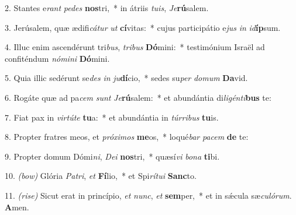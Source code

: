 2. Stantes e\textit{rant} \textit{pe}\textit{des} \textbf{nos}tri,~* 
	in átriis \textit{tu}\textit{is}, \textit{Je}\textbf{rú}salem.

3. Jerúsalem, quæ ædifi\textit{cá}\textit{tur} \textit{ut} \textbf{cí}vitas:~*
	cujus participátio e\textit{jus} \textit{in} \textit{id}\textbf{íp}sum.

4. Illuc enim ascendérunt tri\textit{bus}, \textit{tri}\textit{bus} \textbf{Dó}mini:~*
	testimónium Israël ad confiténdum \textit{nó}\textit{mi}\textit{ni} \textbf{Dó}mini.

5. Quia illic sedérunt se\textit{des} \textit{in} \textit{ju}\textbf{dí}cio,~*
	sedes su\textit{per} \textit{do}\textit{mum} \textbf{Da}vid.

6. Rogáte quæ ad pa\textit{cem} \textit{sunt} \textit{Je}\textbf{rú}salem:~*
	et abundántia di\textit{li}\textit{gén}\textit{ti}\textbf{bus} te:

7. Fiat pax in \textit{vir}\textit{tú}\textit{te} \textbf{tu}a:~*
	et abundántia in \textit{túr}\textit{ri}\textit{bus} \textbf{tu}is.

8. Propter fratres meos, et \textit{pró}\textit{xi}\textit{mos} \textbf{me}os,~* 
	loqué\textit{bar} \textit{pa}\textit{cem} \textbf{de} te:

9. Propter domum Dómi\textit{ni}, \textit{De}\textit{i} \textbf{nos}tri,~* 
	quæsí\textit{vi} \textit{bo}\textit{na} \textbf{ti}bi.

10. {\color{red}\textit{(bow)}} Glória \textit{Pa}\textit{tri}, \textit{et} \textbf{Fí}lio,~*
	et Spi\textit{rí}\textit{tu}\textit{i} \textbf{Sanc}to.

11. {\color{red}\textit{(rise)}} Sicut erat in princípio, \textit{et} \textit{nunc}, \textit{et} \textbf{sem}per,~*
	et in s\'{\ae}cula sæ\textit{cu}\textit{ló}\textit{rum}. \textbf{A}men.
	